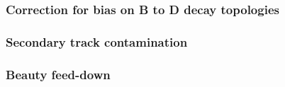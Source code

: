 \subsubsection{Correction for bias on B to D decay topologies}


\subsubsection{Secondary track contamination}


\subsubsection{Beauty feed-down}

